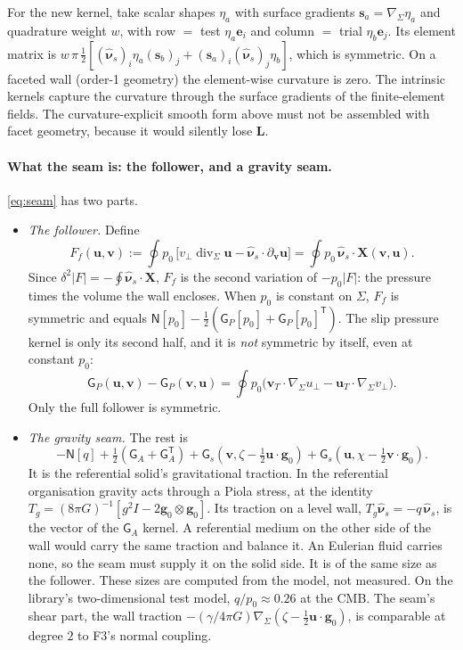 \documentclass[11pt]{article}
\theoremstyle{definition}
\theoremstyle{remark}
\newcommand{\bu}{\mathbf{u}}
\newcommand{\bv}{\mathbf{v}}
\newcommand{\Div}{\operatorname{div}}
\newcommand{\nuhs}{\hat{\boldsymbol{\nu}}_s}
\begin{document}
For the new kernel, take scalar shapes $\eta_a$ with surface gradients
$\mathbf s_a = \nabla_\Sigma\eta_a$ and quadrature weight $w$, with
row $=$ test $\eta_a\mathbf e_i$ and column $=$ trial $\eta_b\mathbf
e_j$. Its element matrix is $w\,\pi\,\tfrac12[(\nuhs)_i\eta_a(\mathbf
s_b)_j + (\mathbf s_a)_i (\nuhs)_j\eta_b]$, which is symmetric. On a faceted
wall (order-1 geometry) the element-wise curvature is zero. The
intrinsic kernels capture the curvature through the surface gradients
of the finite-element fields. The curvature-explicit smooth form above
must not be assembled with facet geometry, because it would silently
lose $\mathbf L$.

\paragraph{What the seam is: the follower, and a gravity seam.}
\eqref{eq:seam} has two parts.
\begin{itemize}
\item \emph{The follower.} Define
  \begin{equation*}
    F_f(\bu, \bv) := \oint p_0\,\bigl[v_\perp\Div_\Sigma\bu - \nuhs\cdot\partial_{\bv}\bu\bigr] = \oint p_0\,\nuhs\cdot\mathbf
    X(\bv, \bu) .
  \end{equation*}
  Since $\delta^2|F| = -\oint\nuhs\cdot\mathbf X$, $F_f$ is the
  second variation of $-p_0|F|$: the pressure times the volume the wall
  encloses. When $p_0$ is constant on $\Sigma$, $F_f$ is symmetric and
  equals $\mathsf N[p_0] - \tfrac12(\mathsf G_P[p_0] + \mathsf
  G_P[p_0]^{\mathsf T})$. The slip pressure kernel is only its second
  half, and it is \emph{not} symmetric by itself, even at constant
  $p_0$:
  \begin{equation*}
    \mathsf G_P(\bu, \bv) - \mathsf G_P(\bv, \bu) = \oint p_0\bigl(
    \bv_T\cdot\nabla_\Sigma u_\perp - \bu_T\cdot\nabla_\Sigma v_\perp\bigr).
  \end{equation*}
  Only the full follower is symmetric.
\item \emph{The gravity seam.} The rest is
  \begin{equation*}
    -\mathsf N[q] + \tfrac12(\mathsf G_A + \mathsf G_A^{\mathsf T}) +
    \mathsf G_s(\bv, \zeta - \tfrac12\bu\cdot\mathbf g_0) + \mathsf
    G_s(\bu, \chi - \tfrac12\bv\cdot\mathbf g_0) .
  \end{equation*}
  It is the referential solid's gravitational traction. In the
  referential organisation gravity acts through a Piola stress, at the
  identity $T_g = (8\pi G)^{-1}[g^2 I - 2\mathbf g_0\otimes\mathbf
  g_0]$. Its traction on a level wall, $T_g\nuhs = -q\,\nuhs$,
  is the vector of the $\mathsf G_A$ kernel. A referential medium on
  the other side of the wall would carry the same traction and balance
  it. An Eulerian fluid carries none, so the seam must supply it on the
  solid side. It is of the same size as the follower. These sizes are
  computed from the model, not measured. On the library's
  two-dimensional test model, $q/p_0 \approx 0.26$ at the CMB. The
  seam's shear part, the wall traction $-(\gamma/4\pi
  G)\nabla_\Sigma(\zeta - \tfrac12\bu\cdot\mathbf g_0)$, is comparable
  at degree $2$ to F3's normal coupling.
\end{itemize}
\end{document}
